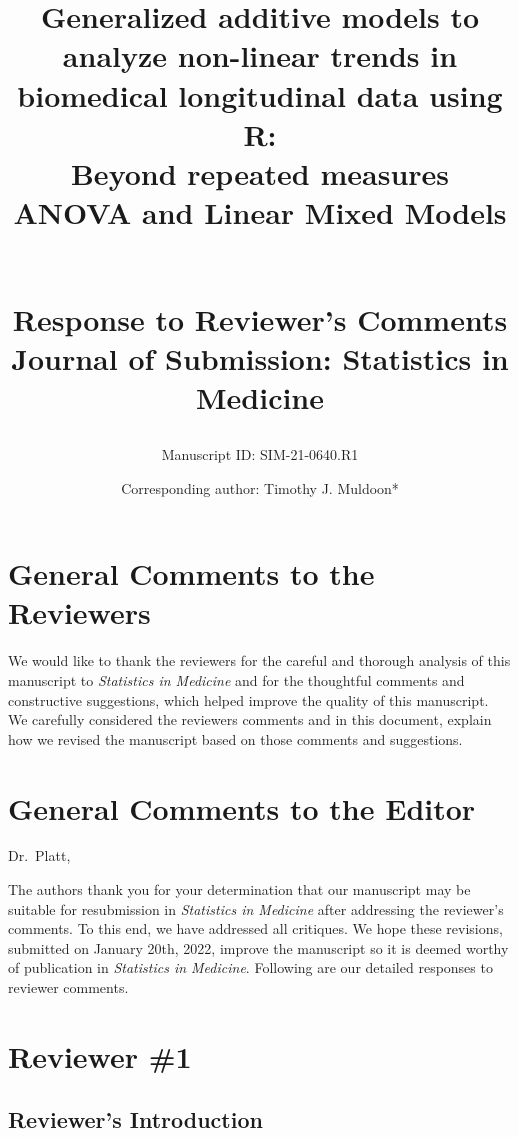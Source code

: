 \documentclass[
]{article}
\title{\textbf{Generalized additive models to analyze non-linear trends in biomedical longitudinal data using R:}\\
Beyond repeated measures ANOVA and Linear Mixed Models\\
\strut \\
\textbf{Response to Reviewer's Comments}\\
Journal of Submission: Statistics in Medicine}
\subtitle{Manuscript ID: SIM-21-0640.R1}
\author{}
\date{\vspace{-2.5em}}
\author{Corresponding author: Timothy J. Muldoon*}
\affil{Department of Biomedical Engineering, University of Arkansas, Fayetteville, AR, USA}
\affil{tmuldoon@uark.edu}
\begin{document}
\maketitle

{
\setcounter{tocdepth}{2}
\tableofcontents
}
\hypertarget{general-comments-to-the-reviewers}{%
\section{General Comments to the Reviewers}\label{general-comments-to-the-reviewers}}

We would like to thank the reviewers for the careful and thorough analysis of this manuscript to \emph{Statistics in Medicine} and for the thoughtful comments and constructive suggestions, which helped improve the quality of this manuscript. We carefully considered the reviewers comments and in this document, explain how we revised the manuscript based on those comments and suggestions.

\hypertarget{general-comments-to-the-editor}{%
\section{General Comments to the Editor}\label{general-comments-to-the-editor}}

Dr.~Platt,

The authors thank you for your determination that our manuscript may be suitable for resubmission in \emph{Statistics in Medicine} after addressing the reviewer's comments. To this end, we have addressed all critiques. We hope these revisions, submitted on January 20th, 2022, improve the manuscript so it is deemed worthy of publication in \emph{Statistics in Medicine}. Following are our detailed responses to reviewer comments.

\hypertarget{reviewer-1}{%
\section{Reviewer \#1}\label{reviewer-1}}

\hypertarget{reviewers-introduction}{%
\subsection{Reviewer's Introduction}\label{reviewers-introduction}}
\end{document}
